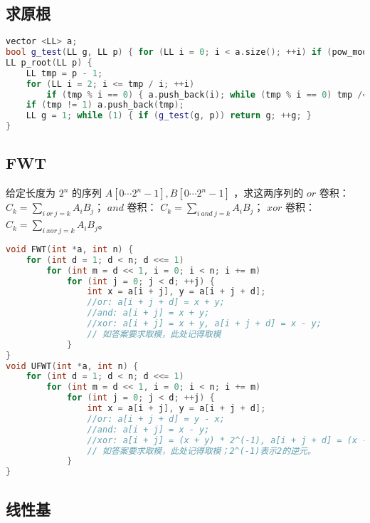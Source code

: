 \documentclass[landscape,a4paper]{article}
\begin{document}
\subsection{求原根}
\begin{lstlisting}[language=C++]
vector <LL> a;
bool g_test(LL g, LL p) { for (LL i = 0; i < a.size(); ++i) if (pow_mod(g, (p-1)/a[i], p) == 1) return 0; return 1; }
LL p_root(LL p) {
	LL tmp = p - 1;
	for (LL i = 2; i <= tmp / i; ++i)
		if (tmp % i == 0) { a.push_back(i); while (tmp % i == 0) tmp /= i; }
	if (tmp != 1) a.push_back(tmp);
	LL g = 1; while (1) { if (g_test(g, p)) return g; ++g; }
}
\end{lstlisting}

\subsection{FWT}
给定长度为 $2^n$ 的序列 $A[0 \cdots 2^n-1], B[0 \cdots 2^n-1]$ ，求这两序列的
 $or$ 卷积： $C_k = \sum\limits_{i \ or \ j=k} A_iB_j$；
 $and$ 卷积： $C_k = \sum\limits_{i \ and \ j=k} A_iB_j$；
 $xor$ 卷积： $C_k = \sum\limits_{i \ xor \ j=k} A_iB_j$。
\begin{lstlisting}[language=C++]
void FWT(int *a, int n) {
    for (int d = 1; d < n; d <<= 1)
        for (int m = d << 1, i = 0; i < n; i += m)
            for (int j = 0; j < d; ++j) {
                int x = a[i + j], y = a[i + j + d];
                //or: a[i + j + d] = x + y;
                //and: a[i + j] = x + y;
                //xor: a[i + j] = x + y, a[i + j + d] = x - y;
                // 如答案要求取模，此处记得取模
            }
}
void UFWT(int *a, int n) {
    for (int d = 1; d < n; d <<= 1)
        for (int m = d << 1, i = 0; i < n; i += m)
            for (int j = 0; j < d; ++j) {
                int x = a[i + j], y = a[i + j + d];
                //or: a[i + j + d] = y - x;
                //and: a[i + j] = x - y;
                //xor: a[i + j] = (x + y) * 2^(-1), a[i + j + d] = (x - y) * 2^(-1);
                // 如答案要求取模，此处记得取模；2^(-1)表示2的逆元。
            }
}
\end{lstlisting}

\subsection{线性基}
\end{document}

